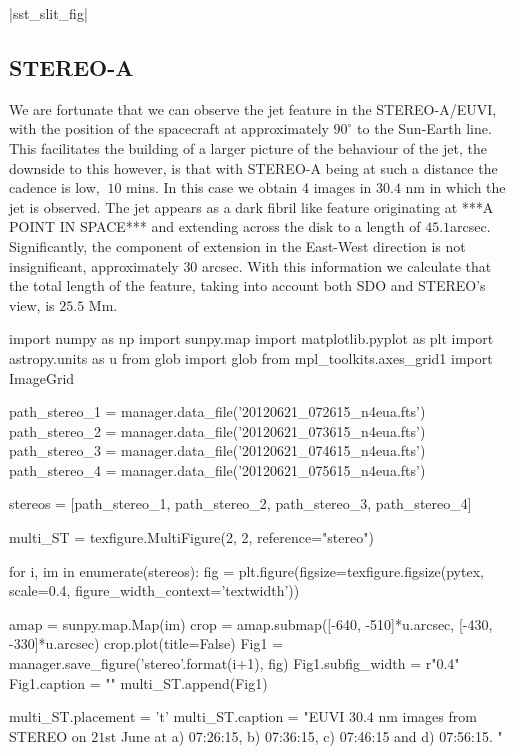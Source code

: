\documentclass{emulateapj}
\begin{document}
|sst_slit_fig|



\subsection{STEREO-A}
We are fortunate that we can observe the jet feature in the STEREO-A/EUVI, with the position of the spacecraft at approximately $90^\circ$ to the Sun-Earth line.
This facilitates the building of a larger picture of the behaviour of the jet, the downside to this however, is that with STEREO-A being at such a distance the cadence is low, $~10$ mins.
In this case we obtain 4 images in $30.4$ nm in which the jet is observed.
The jet appears as a dark fibril like feature originating at ***A POINT IN SPACE*** and extending across the disk to a length of $45.1$arcsec.
Significantly, the component of extension in the East-West direction is not insignificant, approximately $30$ arcsec.
With this information we calculate that the total length of the feature, taking into account both SDO and STEREO's view, is $25.5$ Mm.



\begin{pycode}[STEREO]
import numpy as np
import sunpy.map
import matplotlib.pyplot as plt
import astropy.units as u
from glob import glob
from mpl_toolkits.axes_grid1 import ImageGrid

path_stereo_1 = manager.data_file('20120621_072615_n4eua.fts')
path_stereo_2 = manager.data_file('20120621_073615_n4eua.fts')
path_stereo_3 = manager.data_file('20120621_074615_n4eua.fts')
path_stereo_4 = manager.data_file('20120621_075615_n4eua.fts')

stereos = [path_stereo_1, path_stereo_2, path_stereo_3, path_stereo_4]


multi_ST = texfigure.MultiFigure(2, 2, reference="stereo")


for i, im in enumerate(stereos):
	fig = plt.figure(figsize=texfigure.figsize(pytex, scale=0.4, figure_width_context='textwidth'))
	
	amap = sunpy.map.Map(im)
	crop = amap.submap([-640, -510]*u.arcsec, [-430, -330]*u.arcsec)
	crop.plot(title=False)
	Fig1 = manager.save_figure('stereo{}'.format(i+1), fig)
	Fig1.subfig_width = r"0.4\textwidth"
	Fig1.caption = ""
	multi_ST.append(Fig1)

multi_ST.placement = 't'
multi_ST.caption = "EUVI $30.4$ nm images from STEREO on $21$st June at a) 07:26:15, b) 07:36:15, c) 07:46:15 and d) 07:56:15. "
\end{pycode}
\end{document}
